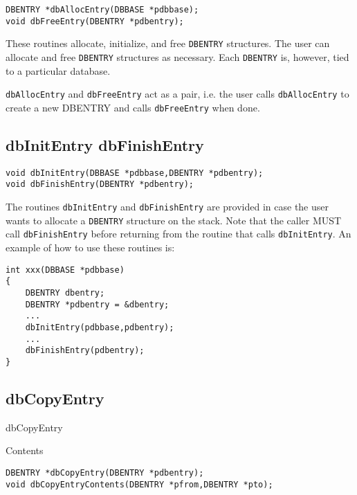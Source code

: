 \begin{verbatim}
DBENTRY *dbAllocEntry(DBBASE *pdbbase);
void dbFreeEntry(DBENTRY *pdbentry);
\end{verbatim}

These routines allocate, initialize, and free \verb|DBENTRY| structures. The user can allocate and free \verb|DBENTRY| structures as 
necessary. Each \verb|DBENTRY| is, however, tied to a particular database.

\verb|dbAllocEntry| and \verb|dbFreeEntry| act as a pair, i.e. the user calls \verb|dbAllocEntry| to create a new DBENTRY and 
calls \verb|dbFreeEntry| when done.

\subsection{dbInitEntry dbFinishEntry}

\begin{verbatim}
void dbInitEntry(DBBASE *pdbbase,DBENTRY *pdbentry);
void dbFinishEntry(DBENTRY *pdbentry);
\end{verbatim}

The routines \verb|dbInitEntry| and \verb|dbFinishEntry| are provided in case the user wants to allocate a \verb|DBENTRY| structure 
on the stack. Note that the caller MUST call \verb|dbFinishEntry| before returning from the routine that calls 
\verb|dbInitEntry|. An example of how to use these routines is:

\begin{verbatim}
int xxx(DBBASE *pdbbase)
{
    DBENTRY dbentry;
    DBENTRY *pdbentry = &dbentry;
    ...
    dbInitEntry(pdbbase,pdbentry);
    ...
    dbFinishEntry(pdbentry);
}

\end{verbatim}

\subsection{dbCopyEntry}

dbCopyEntry

Contents

\begin{verbatim}
DBENTRY *dbCopyEntry(DBENTRY *pdbentry);
void dbCopyEntryContents(DBENTRY *pfrom,DBENTRY *pto);
\end{verbatim}

